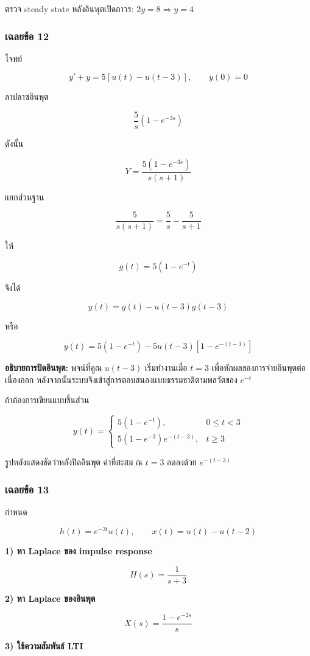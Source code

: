 ตรวจ steady state หลังอินพุตเปิดถาวร: $2y=8\Rightarrow y=4$

\subsubsection{เฉลยข้อ 12}

โจทย์

\[
y'+y=5[u(t)-u(t-3)],\qquad y(0)=0
\]

ลาปลาซอินพุต

\[
\frac{5}{s}(1-e^{-3s})
\]

ดังนั้น

\[
Y=\frac{5(1-e^{-3s})}{s(s+1)}
\]

แยกส่วนฐาน

\[
\frac{5}{s(s+1)}=\frac{5}{s}-\frac{5}{s+1}
\]

ให้

\[
g(t)=5(1-e^{-t})
\]

จึงได้

\[
\boxed{y(t)=g(t)-u(t-3)g(t-3)}
\]

หรือ

\[
\boxed{y(t)=5(1-e^{-t})-5u(t-3)\left[1-e^{-(t-3)}\right]}
\]

\textbf{อธิบายการปิดอินพุต:} พจน์ที่คูณ $u(t-3)$ เริ่มทำงานเมื่อ $t=3$ เพื่อหักผลของการจ่ายอินพุตต่อเนื่องออก หลังจากนั้นระบบจึงเข้าสู่การตอบสนองแบบธรรมชาติตามพลวัตของ $e^{-t}$

ถ้าต้องการเขียนแบบชิ้นส่วน

\[
y(t)=
\begin{cases}
5(1-e^{-t}),&0\le t<3\\
5(1-e^{-3})e^{-(t-3)},&t\ge3
\end{cases}
\]

รูปหลังแสดงชัดว่าหลังปิดอินพุต ค่าที่สะสม ณ $t=3$ ลดลงด้วย $e^{-(t-3)}$

\subsubsection{เฉลยข้อ 13}

กำหนด

\[
h(t)=e^{-3t}u(t),\qquad x(t)=u(t)-u(t-2)
\]

\textbf{1) หา Laplace ของ impulse response}

\[
H(s)=\frac{1}{s+3}
\]

\textbf{2) หา Laplace ของอินพุต}

\[
X(s)=\frac{1-e^{-2s}}{s}
\]

\textbf{3) ใช้ความสัมพันธ์ LTI}


